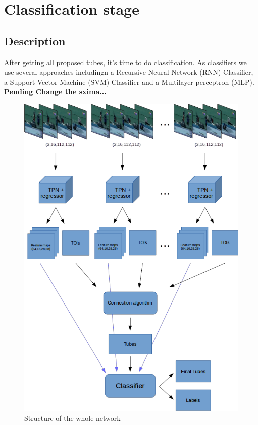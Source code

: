\documentclass{report}
\begin{document}
\chapter{Classification stage}
\section{Description}
After getting all proposed tubes, it's time to do classification. As classifiers we use several approaches includingn
a Recursive Neural Network (RNN) Classifier, a Support Vector Machine (SVM) Classifier and a Multilayer perceptron (MLP).
\\
\textbf{Pending Change the sxima...}
\\
\begin{figure}[h]
  \centering
  \includegraphics[scale=0.7]{model}
  \caption{Structure of the whole network}
  \label{fig:whole_network}
\end{figure}
\end{document}
